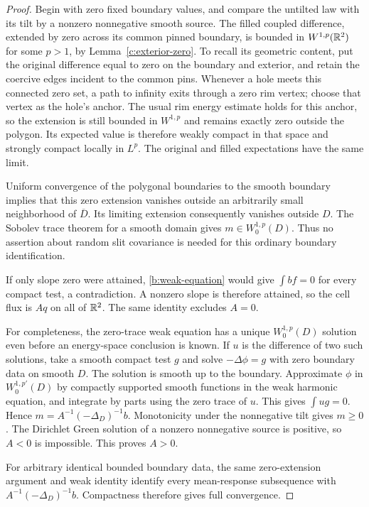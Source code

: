 \begin{proof}
Begin with zero fixed boundary values, and compare the untilted law with
its tilt by a nonzero nonnegative smooth source. The filled coupled
difference, extended by zero across its common pinned boundary, is bounded
in $W^{1,p}(\mathbb R^2)$ for some $p>1$, by
Lemma~\ref{c:exterior-zero}. To recall its geometric content, put the
original difference equal to zero on the boundary and exterior, and
retain the coercive edges incident to the common pins. Whenever a hole
meets this connected zero set, a path to infinity exits through a zero
rim vertex; choose that vertex as the hole's anchor. The usual rim
energy estimate holds for this anchor, so the extension is still bounded
in $W^{1,p}$ and remains exactly zero outside the polygon. Its expected
value is therefore weakly compact in that
space and strongly compact locally in
$L^p$. The original and filled expectations have the same limit.

Uniform convergence of the polygonal boundaries to the smooth boundary
implies that this zero extension vanishes outside an arbitrarily small
neighborhood of $\overline D$. Its limiting extension consequently
vanishes outside $D$. The Sobolev trace theorem for a smooth domain gives
$m\in W^{1,p}_0(D)$. Thus no assertion about random slit covariance is
needed for this ordinary boundary identification.

If only slope zero were attained, \eqref{b:weak-equation} would give
$\int b f=0$ for every compact test, a contradiction. A nonzero slope
is therefore attained, so the cell flux is $Aq$ on all of $\mathbb R^2$.
The same identity excludes $A=0$.

For completeness, the zero-trace weak equation has a unique
$W^{1,p}_0(D)$ solution even before an energy-space conclusion is known.
If $u$ is the difference of two such solutions, take a smooth compact
test $g$ and solve $-\Delta\phi=g$ with zero boundary data on smooth $D$.
The solution is smooth up to the boundary. Approximate $\phi$ in
$W^{1,p'}_0(D)$ by compactly supported smooth functions in the weak
harmonic equation, and integrate by parts using the zero trace of $u$.
This gives $\int u g=0$. Hence $m=A^{-1}(-\Delta_D)^{-1}b$.
Monotonicity under the nonnegative tilt gives $m\ge0$. The Dirichlet
Green solution of a nonzero nonnegative source is positive, so $A<0$
is impossible. This proves $A>0$.

For arbitrary identical bounded boundary data, the same zero-extension
argument and weak identity identify every mean-response subsequence with
$A^{-1}(-\Delta_D)^{-1}b$. Compactness therefore gives full convergence.


\end{proof}

